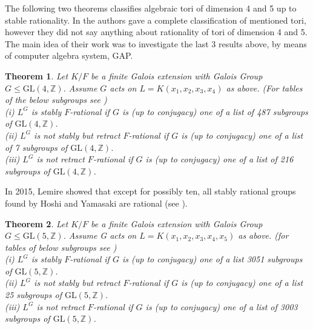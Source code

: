 \documentclass[a4paper, 14pt]{extarticle}
\theoremstyle{plain}
\newtheorem{theorem}{Theorem}
\theoremstyle{definition}
\newcommand{\Z}{\ensuremath{\mathbb{Z}}}
\newcommand{\G}{G}
\newcommand{\glat}{$G$-lattice}
\begin{document}
%
The following two theorems classifies algebraic tori of dimension 4 and  5 up to stable 
rationality. In \cite{Hoshi} the authors gave a complete classification of mentioned tori, 
however they did not say anything about rationality of tori of dimension 4 and 5. The 
main idea of their work was to investigate the last 3 results above, by means of computer 
algebra system, GAP. 
\begin{theorem}\cite[Theorem 1.9]{Hoshi}
Let $K/F$ be a finite Galois extension with Galois Group $\G \leqslant \mathrm{GL}(4, \Z)$. 
Assume $G$ acts on $L = K(x_1,x_2,x_3,x_4)$ as above. (For tables of the below subgroups 
see \cite[Page 4]{Hoshi})
\\ 
(i) $L^\G$ is stably $F$-rational if $G$ is (up to conjugacy) one of a list of 487 
subgroups of $\mathrm{GL}(4,\Z)$.
\\ 
(ii)  $L^\G$ is not stably but retract $F$-rational if $G$ is (up to conjugacy) one 
of a list of 7 subgroups of $\mathrm{GL}(4,\Z)$.
\\
(iii) $L^\G$ is not retract $F$-rational if $G$ is (up to conjugacy) one of a list of 
216 subgroups of $\mathrm{GL}(4,\Z)$.
 \end{theorem}
 \noindent
In 2015, Lemire showed that except for possibly ten, all stably rational groups found 
by Hoshi and Yamasaki are rational (see \cite{Nicole1}).
\begin{theorem}\label{H}\cite[Theorem 1.12]{Hoshi}
Let $K/F$ be a finite Galois extension with Galois Group $\G  \leqslant \mathrm{GL}(5, \Z)$. 
Assume G acts on $L = K(x_1,x_2,x_3,x_4,x_5)$ as above. (for tables of below subgroups see 
\cite[Pages 134-144]{Hoshi})
\\ 
(i) $L^\G$ is stably $F$-rational if $G$ is (up to conjugacy) one of a list 3051 subgroups 
of $\mathrm{GL}(5,\Z)$.
\\ 
(ii)  $L^\G$ is not stably but retract $F$-rational if $G$ is (up to conjugacy) one of a list 
25 subgroups of $\mathrm{GL}(5,\Z)$.
\\
(iii) $L^\G$ is not retract $F$-rational if $G$ is (up to conjugacy) one of a list of 3003 
subgroups of $\mathrm{GL}(5,\Z)$.
 \end{theorem}
\end{document}
